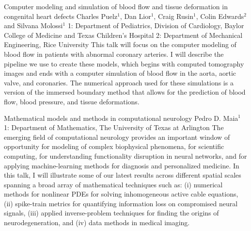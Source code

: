 \vspace{1.5ex}
\abs
{Computer modeling and simulation of blood flow and tissue deformation in congenital heart defects}
{Charles Puelz$^{1}$, Dan Lior$^{1}$, Craig Rusin$^{1}$, Colin Edwards$^{2}$ and Silvana Molossi$^{1}$}
{1: Department of Pediatrics, Division of Cardiology, Baylor College of Medicine and Texas Children's Hospital 2: Department of Mechanical Engineering, Rice University}
{This talk will focus on the computer modeling of blood flow in patients with abnormal coronary arteries. I will describe the pipeline we use to create these models, which begins with computed tomography images and ends with a computer simulation of blood flow in the aorta, aortic valve, and coronaries. The numerical approach used for these simulations is a version of the immersed boundary method that allows for the prediction of blood flow, blood pressure, and tissue deformations.}


\vspace{1.5ex}
\abs
{Mathematical models and methods in computational neurology}
{Pedro D. Maia$^{1}$}
{1: Department of Mathematics, The University of Texas at Arlington}
{The emerging field of computational neurology provides an important window of opportunity for modeling of complex biophysical phenomena, for scientific computing, for understanding functionality disruption in neural networks, and for applying machine-learning methods for diagnosis and personalized medicine. In this talk, I will illustrate some of our latest results across different spatial scales spanning a broad array of mathematical techniques such as: (i) numerical methods for nonlinear PDEs for solving inhomogeneous active cable equations, (ii) spike-train metrics for quantifying information loss on compromised neural signals, (iii) applied inverse-problem techniques for finding the origins of neurodegeneration, and (iv) data methods in medical imaging.}


